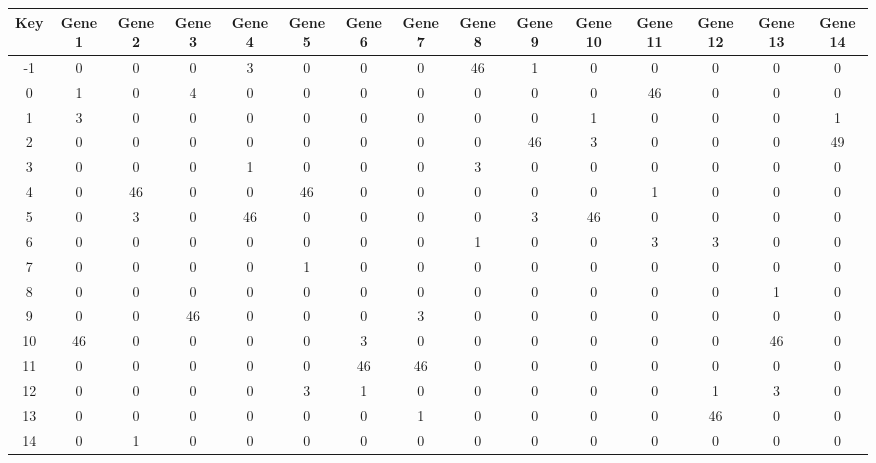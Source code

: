 \begin{tabular}{|c|c|c|c|c|c|c|c|c|c|c|c|c|c|c|}
\hline
Key & Gene 1 & Gene 2 & Gene 3 & Gene 4 & Gene 5 & Gene 6 & Gene 7 & Gene 8 & Gene 9 & Gene 10 & Gene 11 & Gene 12 & Gene 13 & Gene 14 \\
\hline
-1 & 0 & 0 & 0 & 3 & 0 & 0 & 0 & 46 & 1 & 0 & 0 & 0 & 0 & 0 \\
0 & 1 & 0 & 4 & 0 & 0 & 0 & 0 & 0 & 0 & 0 & 46 & 0 & 0 & 0 \\
1 & 3 & 0 & 0 & 0 & 0 & 0 & 0 & 0 & 0 & 1 & 0 & 0 & 0 & 1 \\
2 & 0 & 0 & 0 & 0 & 0 & 0 & 0 & 0 & 46 & 3 & 0 & 0 & 0 & 49 \\
3 & 0 & 0 & 0 & 1 & 0 & 0 & 0 & 3 & 0 & 0 & 0 & 0 & 0 & 0 \\
4 & 0 & 46 & 0 & 0 & 46 & 0 & 0 & 0 & 0 & 0 & 1 & 0 & 0 & 0 \\
5 & 0 & 3 & 0 & 46 & 0 & 0 & 0 & 0 & 3 & 46 & 0 & 0 & 0 & 0 \\
6 & 0 & 0 & 0 & 0 & 0 & 0 & 0 & 1 & 0 & 0 & 3 & 3 & 0 & 0 \\
7 & 0 & 0 & 0 & 0 & 1 & 0 & 0 & 0 & 0 & 0 & 0 & 0 & 0 & 0 \\
8 & 0 & 0 & 0 & 0 & 0 & 0 & 0 & 0 & 0 & 0 & 0 & 0 & 1 & 0 \\
9 & 0 & 0 & 46 & 0 & 0 & 0 & 3 & 0 & 0 & 0 & 0 & 0 & 0 & 0 \\
10 & 46 & 0 & 0 & 0 & 0 & 3 & 0 & 0 & 0 & 0 & 0 & 0 & 46 & 0 \\
11 & 0 & 0 & 0 & 0 & 0 & 46 & 46 & 0 & 0 & 0 & 0 & 0 & 0 & 0 \\
12 & 0 & 0 & 0 & 0 & 3 & 1 & 0 & 0 & 0 & 0 & 0 & 1 & 3 & 0 \\
13 & 0 & 0 & 0 & 0 & 0 & 0 & 1 & 0 & 0 & 0 & 0 & 46 & 0 & 0 \\
14 & 0 & 1 & 0 & 0 & 0 & 0 & 0 & 0 & 0 & 0 & 0 & 0 & 0 & 0 \\
\hline
\end{tabular}